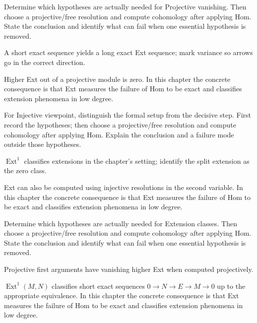 \begin{exercise}\label{exr:v27-04}
Determine which hypotheses are actually needed for Projective vanishing. Then choose a projective/free resolution and compute cohomology after applying Hom. State the conclusion and identify what can fail when one essential hypothesis is removed.
\end{exercise}
\begin{hint}
A short exact sequence yields a long exact Ext sequence; mark variance so arrows go in the correct direction.
\end{hint}
\begin{solution}
Higher Ext out of a projective module is zero. In this chapter the concrete consequence is that Ext measures the failure of Hom to be exact and classifies extension phenomena in low degree.
\end{solution}

\begin{exercise}\label{exr:v27-05}
For Injective viewpoint, distinguish the formal setup from the decisive step. First record the hypotheses; then choose a projective/free resolution and compute cohomology after applying Hom. Explain the conclusion and a failure mode outside those hypotheses.
\end{exercise}
\begin{hint}
\(\operatorname{Ext}^1\) classifies extensions in the chapter's setting; identify the split extension as the zero class.
\end{hint}
\begin{solution}
Ext can also be computed using injective resolutions in the second variable. In this chapter the concrete consequence is that Ext measures the failure of Hom to be exact and classifies extension phenomena in low degree.
\end{solution}

\begin{exercise}\label{exr:v27-06}
Determine which hypotheses are actually needed for Extension classes. Then choose a projective/free resolution and compute cohomology after applying Hom. State the conclusion and identify what can fail when one essential hypothesis is removed.
\end{exercise}
\begin{hint}
Projective first arguments have vanishing higher Ext when computed projectively.
\end{hint}
\begin{solution}
$\operatorname{Ext}^1(M,N)$ classifies short exact sequences $0\to N\to E\to M\to0$ up to the appropriate equivalence. In this chapter the concrete consequence is that Ext measures the failure of Hom to be exact and classifies extension phenomena in low degree.
\end{solution}

